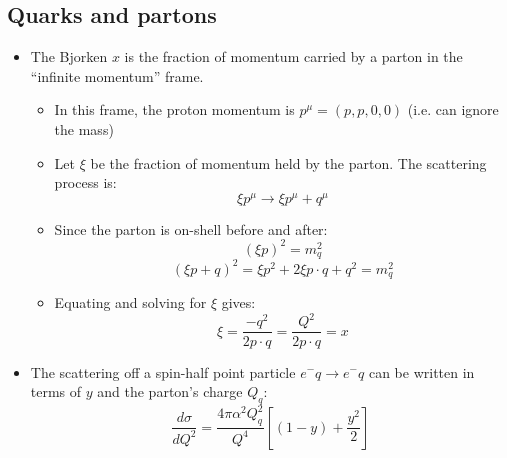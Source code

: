 \documentclass[11pt]{article}
\newcommand{\dd}[2]{\dfrac{d #1}{d #2}}
\newcommand{\el}{\ensuremath{e^{-}}\xspace}
\begin{document}
\subsection{Quarks and partons}
\begin{itemize}
  \item The Bjorken $x$ is the fraction of momentum carried by a parton in the ``infinite momentum'' frame.
  \begin{itemize}
    \item In this frame, the proton momentum is $p^\mu = (p,p,0,0)$ (i.e. can ignore the mass)
    \item Let $\xi$ be the fraction of momentum held by the parton. The scattering process is:
    \begin{equation}
      \xi p^\mu \rightarrow \xi p^\mu + q^\mu
    \end{equation}
    \item Since the parton is on-shell before and after:
    \begin{equation}
      (\xi p)^2 =  m_q^2
    \end{equation}
    \begin{equation}
      (\xi p + q)^2 = \xi p^2 + 2\xi p\cdot q + q^2 = m_q^2
    \end{equation}
    \item Equating and solving for $\xi$ gives:
    \begin{equation}
      \xi = \frac{-q^2}{2p\cdot q} = \frac{Q^2}{2p\cdot q} = x
    \end{equation}
  \end{itemize}
  \item The scattering off a spin-half point particle $\el q \rightarrow \el q$ can be written in terms of $y$ and the parton's charge $Q_q$:
  \begin{equation}
    \dd\sigma{Q^2} = \frac{4\pi\alpha^2Q_q^2}{Q^4} \left[(1-y) + \frac{y^2}{2}\right]
  \end{equation}
\end{itemize}
\end{document}
